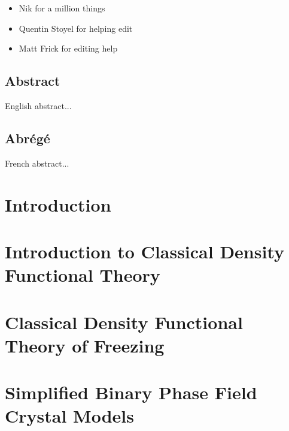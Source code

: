\documentclass[12pt, letterpaper]{report}
\begin{document}
{
    \color{ForestGreen}
    \begin{itemize}
        \item Nik for a million things
        \item Quentin Stoyel for helping edit
        \item Matt Frick for editing help
    \end{itemize}
}

\clearpage

\section*{Abstract}
\label{sec:abstract}

English abstract...

\clearpage

\section*{Abrégé}
\label{sec:abrege}

French abstract...

\clearpage

\tableofcontents 
\listoffigures
\listoftables


\chapter{Introduction}
\label{introduction}


\chapter{Introduction to Classical Density Functional Theory}


\chapter{Classical Density Functional Theory of Freezing}
\label{dft_of_freezing}


\chapter{Simplified Binary Phase Field Crystal Models}

\end{document}
